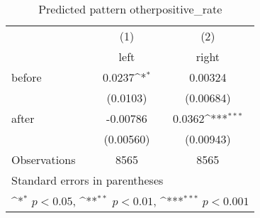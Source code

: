 \begin{table}[htbp]\centering
\def\sym#1{\ifmmode^{#1}\else\(^{#1}\)\fi}
\caption{Predicted pattern otherpositive\_rate}
\begin{tabular}{l*{2}{c}}
\hline\hline
                    &\multicolumn{1}{c}{(1)}&\multicolumn{1}{c}{(2)}\\
                    &\multicolumn{1}{c}{left}&\multicolumn{1}{c}{right}\\
\hline
before              &      0.0237\sym{*}  &     0.00324         \\
                    &    (0.0103)         &   (0.00684)         \\
[1em]
after               &    -0.00786         &      0.0362\sym{***}\\
                    &   (0.00560)         &   (0.00943)         \\
\hline
Observations        &        8565         &        8565         \\
\hline\hline
\multicolumn{3}{l}{\footnotesize Standard errors in parentheses}\\
\multicolumn{3}{l}{\footnotesize \sym{*} \(p<0.05\), \sym{**} \(p<0.01\), \sym{***} \(p<0.001\)}\\
\end{tabular}
\end{table}
